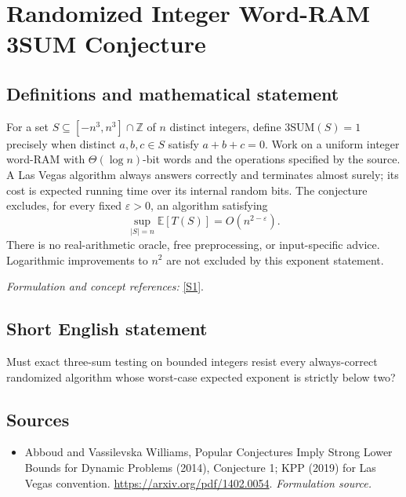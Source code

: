 \documentclass[11pt]{article}
\begin{document}
\section*{\texorpdfstring{Randomized Integer Word-RAM 3SUM Conjecture}{Randomized Integer Word-RAM 3SUM Conjecture}}\label{30006762}
\subsection{Definitions and mathematical statement}
For a set $S\subseteq[-n^3,n^3]\cap{\mathbb{Z}}$ of $n$ distinct integers, define
$\mathrm{3SUM}(S)=1$ precisely when distinct $a,b,c\in S$ satisfy $a+b+c=0$. Work on a uniform integer word-RAM with $\Theta(\log n)$-bit words and the operations specified by the source. A Las Vegas algorithm always answers correctly and terminates almost surely; its cost is expected running time over its internal random bits. The conjecture excludes, for every fixed ${\varepsilon}>0$, an algorithm satisfying
\[
 \sup_{|S|=n}{\mathbb{E}}[T(S)]=O(n^{2-{\varepsilon}}).
\]
There is no real-arithmetic oracle, free preprocessing, or input-specific advice. Logarithmic improvements to $n^2$ are not excluded by this exponent statement.
\par\smallskip\textit{Formulation and concept references:} \href{https://arxiv.org/pdf/1402.0054}{[S1]}.

\subsection{Short English statement}
Must exact three-sum testing on bounded integers resist every always-correct randomized algorithm whose worst-case expected exponent is strictly below two?
\subsection{Sources}
\begin{itemize}
\item[S1]Abboud and Vassilevska Williams, Popular Conjectures Imply Strong Lower Bounds for Dynamic Problems (2014), Conjecture 1; KPP (2019) for Las Vegas convention.
\url{https://arxiv.org/pdf/1402.0054}.
\textit{Formulation source.}
\end{itemize}
\end{document}
